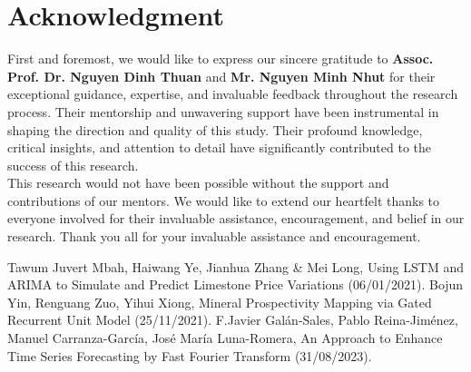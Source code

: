 \documentclass{ieeeojies}
\begin{document}
\section*{Acknowledgment}
First and foremost, we would like to express our sincere gratitude to \textbf{Assoc. Prof. Dr. Nguyen Dinh Thuan} and \textbf{Mr. Nguyen Minh Nhut} for their exceptional guidance, expertise, and invaluable feedback throughout the research process. Their mentorship and unwavering support have been instrumental in shaping the direction and quality of this study. Their profound knowledge, critical insights, and attention to detail have significantly contributed to the success of this research.
\\This research would not have been possible without the support and contributions of our mentors. We would like to extend our heartfelt thanks to everyone involved for their invaluable assistance, encouragement, and belief in our research. Thank you all for your invaluable assistance and encouragement.

\begin{thebibliography}{00}
 Tawum Juvert Mbah, Haiwang Ye, Jianhua Zhang & Mei Long,
Using LSTM and ARIMA to Simulate and Predict Limestone Price Variations (06/01/2021).
 Bojun Yin, Renguang Zuo, Yihui Xiong, Mineral Prospectivity Mapping via Gated Recurrent Unit Model (25/11/2021).
 F.Javier Galán-Sales, Pablo Reina-Jiménez, Manuel Carranza-García, José María Luna-Romera, An Approach to Enhance Time Series Forecasting by Fast Fourier Transform (31/08/2023).

\end{thebibliography}


\EOD
\end{document}
